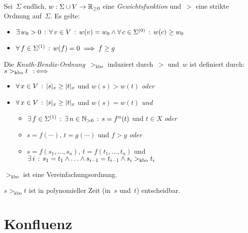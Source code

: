 \documentclass{cheat-sheet}
\newcommand{\size}[1]{\abs{{#1}}} %
\newcommand{\kbo}{>_\text{kbo}} %
\begin{document}



\begin{defn}
  Sei~$\Sigma$ endlich, $w : \Sigma \cup V \to \mathbb{R}_{\geq 0}$ eine \emph{Gewichtsfunktion} und~${>}$ eine strikte Ordnung auf~$\Sigma$.
  Es gelte:
  \begin{itemize}
    \item $\exists \, {w_0 > 0} \,:\, \forall \, {v \in V} \,:\, w(v) = w_0 \wedge \forall \, {c \in \Sigma^{(0)}} \,:\, w(c) \geq w_0$
    \item $\forall \, {f \in \Sigma^{(1)}} \,:\, w(f) = 0 \implies f \geq g$
  \end{itemize}
  Die \emph{Knuth-Bendix-Ordnung}~${\kbo}$ induziert durch~${>}$ und~$w$ ist definiert durch: $s \kbo t \coloniff\,$
  \begin{itemize}
    \item $\fa{x \in V} \size{s}_x \geq \size{t}_x$ und $w(s) > w(t)$ \textit{oder}
    \item $\fa{x \in V} \size{s}_x \geq \size{t}_x$ und $w(s) = w(t)$ \textit{und}
    \begin{itemize}
      \item $\exists \, {f \in \Sigma^{(1)}} \,:\, \exists \, {n \in \mathbb{N}_{> 0}} \,:\, s = f^n(t)$ und $t \in X$ \textit{oder}
      \item $s = f(\cdots)$, $t = g(\cdots)$ und $f > g$ \textit{oder}
      \item $s = f(s_1, \ldots, s_n)$, $t = f(t_1, \ldots, t_n)$ und $\ex{i} s_1 = t_1 \wedge \ldots \wedge s_{i-1} = t_{i-1} \wedge s_i \kbo t_i$
    \end{itemize}
  \end{itemize}
\end{defn}


\begin{thm}
  ${\kbo}$ ist eine Vereinfachungsordnung.
\end{thm}


\begin{prop}
  $s \kbo t$ ist in polynomieller Zeit (in~$s$ und~$t$) entscheidbar.
\end{prop}

\section{Konfluenz}
\end{document}
